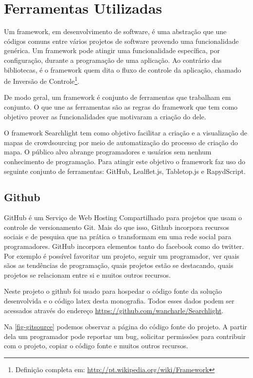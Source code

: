 	  

\section{Ferramentas Utilizadas}

Um framework, em desenvolvimento de software, é uma abstração que une códigos comuns entre vários projetos de software provendo uma funcionalidade genérica. Um framework pode atingir uma funcionalidade específica, por configuração, durante a programação de uma aplicação. Ao contrário das bibliotecas, é o framework quem dita o fluxo de controle da aplicação, chamado de Inversão de Controle\footnote{Definição completa em: \url{http://pt.wikipedia.org/wiki/Framework}}.

De modo geral, um framework é conjunto de ferramentas que trabalham em conjunto. O que une as ferramentas são as regras do framework que tem como objetivo prover as funcionalidades que motivaram a criação do dele.

O framework Searchlight tem como objetivo facilitar a criação e a visualização de mapas de crowdsourcing por meio de automatização do processo de criação do mapa. O público alvo abrange  programadores e usuários sem nenhum conhecimento de programação. Para atingir este objetivo o framework faz uso do seguinte conjunto de ferramentas: GitHub, Lealflet.js,  Tabletop.js e RapydScript. 



\subsection{Github\label{github}}
GitHub é um Serviço de Web Hosting Compartilhado para projetos que usam o controle de versionamento Git. Mais do que isso, Github incorpora recursos sociais e de pesquisa que na prática o transformam em uma rede social para programadores. GitHub incorpora elementos tanto do facebook como do twitter. Por exemplo é possível favoritar um projeto, seguir um programador, ver quais sãos as tendências de programação, quais projetos estão se destacando, quais projetos se relacionam entre si e muitos outros recursos.

Neste projeto o github foi usado para hospedar o código fonte da solução desenvolvida e o código latex desta monografia. Todos esses dados podem ser acessados através do endereço \url{https://github.com/wancharle/Searchlight}. 

Na \autoref{fig-gitsource} podemos observar a página do código fonte do projeto. A partir dela um programador pode reportar um bug, solicitar permissões para contribuir com o projeto, copiar o código fonte e muitos outros recursos. 

